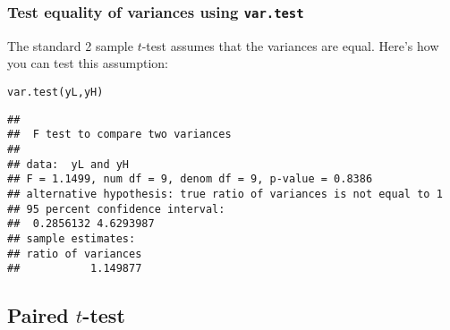 \documentclass[color=usenames,dvipsnames]{beamer}\usepackage[]{graphicx}\usepackage[]{color}
\makeatletter
\newcommand{\hlstd}[1]{\textcolor[rgb]{0,0,0}{#1}}%
\newcommand{\hlkwd}[1]{\textcolor[rgb]{0.004,0.004,0.506}{#1}}%
\newenvironment{kframe}{%
 \def\at@end@of@kframe{}%
 \ifinner\ifhmode%
  \def\at@end@of@kframe{\end{minipage}}%
  \begin{minipage}{\columnwidth}%
 \fi\fi%
 \def\FrameCommand##1{\hskip\@totalleftmargin \hskip-\fboxsep
 \colorbox{shadecolor}{##1}\hskip-\fboxsep
     \hskip-\linewidth \hskip-\@totalleftmargin \hskip\columnwidth}%
 \MakeFramed {\advance\hsize-\width
   \@totalleftmargin\z@ \linewidth\hsize
   \@setminipage}}%
 {\par\unskip\endMakeFramed%
 \at@end@of@kframe}
\newenvironment{knitrout}{}{} %
\makeatother
\begin{document}
\begin{frame}[fragile]
  \frametitle{Test equality of variances using {\tt var.test}
  }
  The standard 2 sample $t$-test assumes that the variances are
  equal. Here's how you can test this assumption:
\begin{knitrout}\scriptsize
{}\color{fgcolor}\begin{kframe}
\begin{alltt}
\hlkwd{var.test}\hlstd{(yL, yH)}
\end{alltt}
\begin{verbatim}
## 
## 	F test to compare two variances
## 
## data:  yL and yH
## F = 1.1499, num df = 9, denom df = 9, p-value = 0.8386
## alternative hypothesis: true ratio of variances is not equal to 1
## 95 percent confidence interval:
##  0.2856132 4.6293987
## sample estimates:
## ratio of variances 
##           1.149877
\end{verbatim}
\end{kframe}
\end{knitrout}
\end{frame}


\begin{comment}
\begin{frame}
  \frametitle{$F$-distribution}

\end{frame}
\end{comment}



\subsection{Paired $t$-test}
\end{document}
